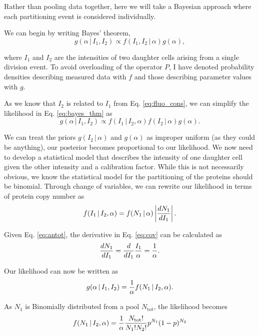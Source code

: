 Rather than pooling data together, here we will take a Bayesian approach where
each partitioning event is considered individually.

We can begin by writing Bayes' theorem,
\begin{equation}
g(\alpha\, \vert \, I_1, I_2) \propto f(I_1, I_2 \,\vert\, \alpha) g(\alpha),
\label{eq:bayes_thm}
\end{equation}

where $I_1$ and $I_2$ are the intensities of two daughter cells arising from
a single division event. To avoid overloading of the operator $P$, I have denoted
probability densities describing measured data with $f$ and those describing
parameter values with $g$.

As we know that $I_2$ is related to $I_1$ from Eq. \ref{eq:fluo_cons}, we can
simplify the likelihood in Eq. \ref{eq:bayes_thm} as
\begin{equation}
g(\alpha \, \vert \, I_1, I_2) \propto f(I_1\, \vert\, I_2, \alpha) f(I_2 \, \vert\, \alpha) g(\alpha).
\end{equation}

We can treat the priors $g(I_2 \,\vert\, \alpha)$ and $g(\alpha)$ as improper
uniform (as they could be anything), our posterior becomes proportional to our
likelihood. We now need to develop a statistical model that describes the
intensity of one daughter cell given the other intensity and a calibration
factor. While this is not necessarily obvious, we know the statistical model
for the partitioning of the proteins should be binomial. Through change of
variables, we can rewrite our likelihood in terms of protein copy number as
\begin{equation}
f(I_1\,\vert\, I_2, \alpha) = f(N_1\,\vert\, \alpha) \left\vert {dN_1 \over dI_1} \right\vert.
\label{eq:cov}
\end{equation}

Given Eq. \ref{eq:antot}, the derivative in Eq. \ref{eq:cov} can be calculated as
\begin{equation}
{dN_1 \over dI_1} = {d \over dI_1} {I_1 \over \alpha} = {1 \over \alpha}.
\end{equation}

Our likelihood can now be written as
\begin{equation}
g(\alpha\,\vert\, I_1, I_2) = {1 \over \alpha} f(N_1\,\vert\, I_2, \alpha).
\end{equation}

As $N_1$ is Binomially distributed from a pool $N_\text{tot}$,  the likelihood becomes
\begin{equation}
f(N_1 \,\vert\, I_2, \alpha) = {1\over \alpha}{N_\text{tot}! \over N_1! N_2!}p^{N_1}(1 - p)^{N_2}
\label{eq:bayes_binom}
\end{equation}

